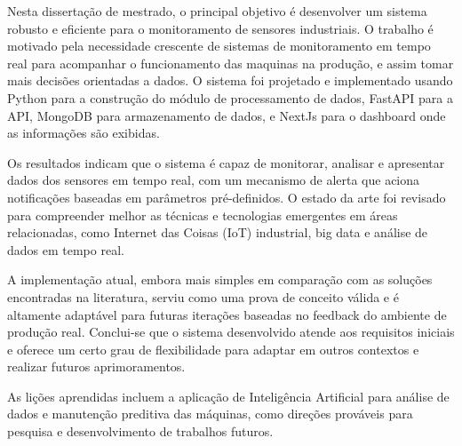 
Nesta dissertação de mestrado, o principal objetivo é desenvolver um sistema robusto e eficiente para o monitoramento de sensores industriais. O trabalho é motivado pela necessidade crescente de sistemas de monitoramento em tempo real para acompanhar o funcionamento das maquinas na produção, e assim tomar mais decisões orientadas a dados. O sistema foi projetado e implementado usando Python para a construção do módulo de processamento de dados, FastAPI para a API, MongoDB para armazenamento de dados, e NextJs para o dashboard onde as informações são exibidas.

Os resultados indicam que o sistema é capaz de monitorar, analisar e apresentar dados dos sensores em tempo real, com um mecanismo de alerta que aciona notificações baseadas em parâmetros pré-definidos. O estado da arte foi revisado para compreender melhor as técnicas e tecnologias emergentes em áreas relacionadas, como Internet das Coisas (IoT) industrial, big data e análise de dados em tempo real.

A implementação atual, embora mais simples em comparação com as soluções encontradas na literatura, serviu como uma prova de conceito válida e é altamente adaptável para futuras iterações baseadas no feedback do ambiente de produção real. Conclui-se que o sistema desenvolvido atende aos requisitos iniciais e oferece um certo grau de flexibilidade para adaptar em outros contextos e realizar futuros aprimoramentos. 

As lições aprendidas incluem a aplicação de Inteligência Artificial para análise de dados e manutenção preditiva das máquinas, como direções prováveis para pesquisa e desenvolvimento de trabalhos futuros. 

\mbox{}\linebreak
{} 


